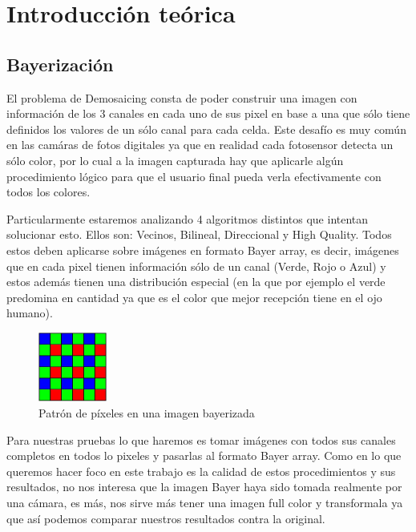 \section{Introducci\'on te\'orica}

\subsection{Bayerización}

El problema de Demosaicing consta de poder construir una imagen con información de los 3 canales en cada uno de sus pixel en base a una que sólo tiene definidos los valores de un sólo canal para cada celda. Este desafío es muy común en las camáras de fotos digitales ya que en realidad cada fotosensor detecta un sólo color, por lo cual a la imagen capturada hay que aplicarle algún procedimiento lógico para que el usuario final pueda verla efectivamente con todos los colores.

Particularmente estaremos analizando 4 algoritmos distintos que intentan solucionar esto. Ellos son: Vecinos, Bilineal, Direccional y High Quality. Todos estos deben aplicarse sobre imágenes en formato Bayer array, es decir, imágenes que en cada pixel tienen información sólo de un canal (Verde, Rojo o Azul) y estos además tienen una distribución especial (en la que por ejemplo el verde predomina en cantidad ya que es el color que mejor recepción tiene en el ojo humano).

\begin{figure}[htb]
\begin{center}
       \includegraphics[width=0.2\textwidth]{imagenes/bayer.jpg}
       \caption{Patrón de píxeles en una imagen bayerizada}
       \end{center}

\end{figure}


Para nuestras pruebas lo que haremos es tomar imágenes con todos sus canales completos en todos lo pixeles y pasarlas al formato Bayer array. Como en lo que queremos hacer foco en este trabajo es la calidad de estos procedimientos y sus resultados, no nos interesa que la imagen Bayer haya sido tomada realmente por una cámara, es más, nos sirve más tener una imagen full color y transformala ya que así podemos comparar nuestros resultados contra la original.

